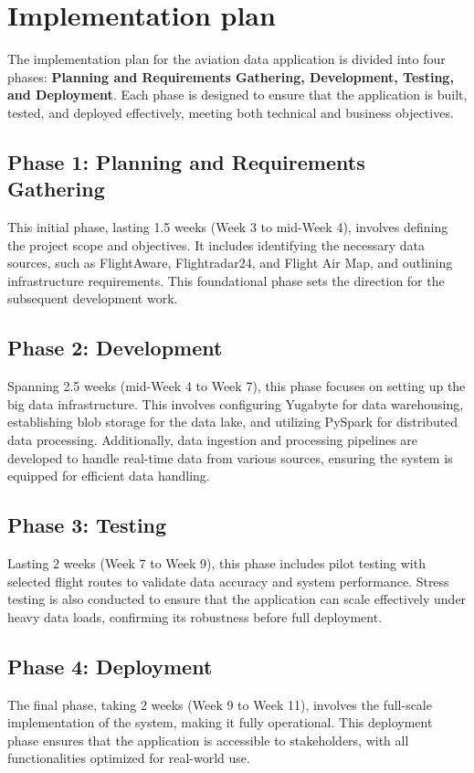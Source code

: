 \documentclass[12pt,a4paper]{article}
\begin{document}
\section{Implementation plan}
The implementation plan for the aviation data application is divided into four
phases: \textbf{Planning and Requirements Gathering, Development, Testing, and
Deployment}. Each phase is designed to ensure that the application is built,
tested, and deployed effectively, meeting both technical and business
objectives.

\subsection*{Phase 1: Planning and Requirements Gathering}
This initial phase, lasting 1.5 weeks (Week 3 to mid-Week 4), involves defining
the project scope and objectives. It includes identifying the necessary data
sources, such as FlightAware, Flightradar24, and Flight Air Map, and outlining
infrastructure requirements. This foundational phase sets the direction for the
subsequent development work.

\subsection*{Phase 2: Development}
Spanning 2.5 weeks (mid-Week 4 to Week 7), this phase focuses on setting up the
big data infrastructure. This involves configuring Yugabyte for data
warehousing, establishing blob storage for the data lake, and utilizing PySpark
for distributed data processing. Additionally, data ingestion and processing
pipelines are developed to handle real-time data from various sources, ensuring
the system is equipped for efficient data handling.
\subsection*{Phase 3: Testing}
Lasting 2 weeks (Week 7 to Week 9), this phase includes pilot testing with
selected flight routes to validate data accuracy and system performance. Stress
testing is also conducted to ensure that the application can scale effectively
under heavy data loads, confirming its robustness before full deployment.
\subsection*{Phase 4: Deployment}
The final phase, taking 2 weeks (Week 9 to Week 11), involves the full-scale
implementation of the system, making it fully operational. This deployment phase
ensures that the application is accessible to stakeholders, with all
functionalities optimized for real-world use.
\end{document}
